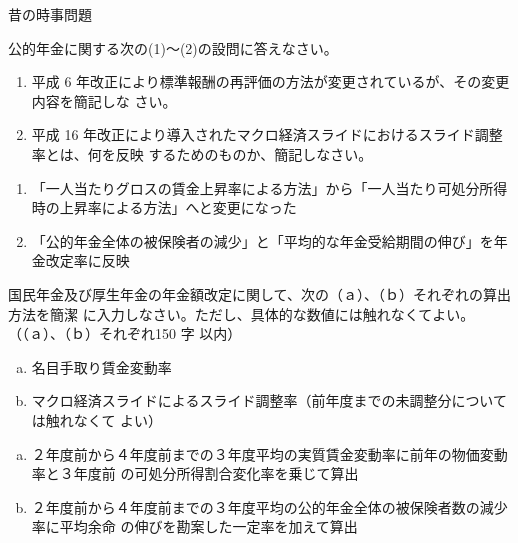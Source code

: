 \begin{explanationbox}
  昔の時事問題
\end{explanationbox}

\begin{shortanswer}[年金1 H28 問題2(4) 改題]
  公的年金に関する次の(1)～(2)の設問に答えなさい。
  \begin{enumerate}[(1)]
    \item 平成 6 年改正により標準報酬の再評価の方法が変更されているが、その変更内容を簡記しな
さい。
    \item 平成 16 年改正により導入されたマクロ経済スライドにおけるスライド調整率とは、何を反映
するためのものか、簡記しなさい。
  \end{enumerate}
\end{shortanswer}

\begin{answerbox}
  \begin{enumerate}[(1)]
    \item 「一人当たりグロスの賃金上昇率による方法」から「一人当たり可処分所得時の上昇率による方法」へと変更になった
    \item 「公的年金全体の被保険者の減少」と「平均的な年金受給期間の伸び」を年金改定率に反映
  \end{enumerate}  
\end{answerbox}


\begin{shortanswer}[年金1 2023 問題2(3)ア]
  国民年金及び厚生年金の年金額改定に関して、次の（ａ）、（ｂ）それぞれの算出方法を簡潔
に入力しなさい。ただし、具体的な数値には触れなくてよい。（（ａ）、（ｂ）それぞれ150 字
以内）

\begin{enumerate}[(a)]
  \item 名目手取り賃金変動率
  \item マクロ経済スライドによるスライド調整率（前年度までの未調整分については触れなくて
よい）
\end{enumerate}

\end{shortanswer}


\begin{answerbox}
\begin{enumerate}[(a)]
  \item ２年度前から４年度前までの３年度平均の実質賃金変動率に前年の物価変動率と３年度前
の可処分所得割合変化率を乗じて算出
  \item ２年度前から４年度前までの３年度平均の公的年金全体の被保険者数の減少率に平均余命
の伸びを勘案した一定率を加えて算出
\end{enumerate}
 
\end{answerbox}

